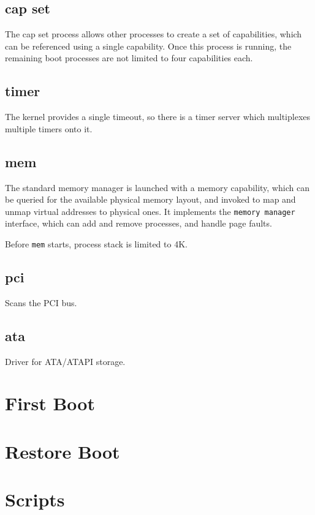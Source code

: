 \subsection{cap set}

The cap set process allows other processes to create a set of capabilities, which can be referenced using a single capability.  Once this process is running, the remaining boot processes are not limited to four capabilities each.

\subsection{timer}

The kernel provides a single timeout, so there is a timer server which multiplexes multiple timers onto it.

\subsection{mem}

The standard memory manager is launched with a memory capability, which can be queried for the available physical memory layout, and invoked to map and unmap virtual addresses to physical ones.  It implements the {\tt memory manager} interface, which can add and remove processes, and handle page faults.

Before {\tt mem} starts, process stack is limited to 4K.

\subsection{pci}

Scans the PCI bus.

\subsection{ata}

Driver for ATA/ATAPI storage.

\section{First Boot}

\section{Restore Boot}

\section{Scripts}

